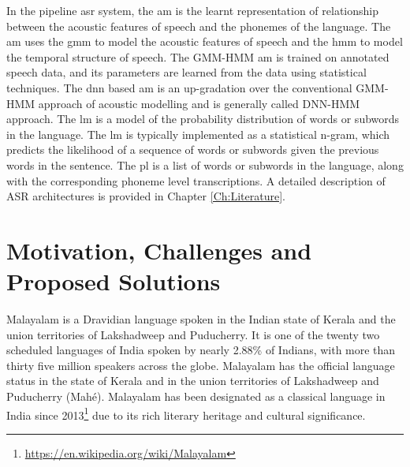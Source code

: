


In the pipeline \gls{asr} system, the \gls{am} is the learnt
representation of relationship between the acoustic features of speech and the
phonemes of the language. The \gls{am} uses the \gls{gmm} to model the acoustic
features of speech and the \gls{hmm} to model the temporal structure of speech.
The GMM-HMM \gls{am} is trained on annotated speech data, and its parameters
are learned from the data using statistical techniques. The \gls{dnn} based
\gls{am} is an up-gradation over the conventional GMM-HMM approach of acoustic
modelling and is generally called DNN-HMM approach. The \gls{lm} is a model of
the probability distribution of words or subwords in the language. The \gls{lm}
is typically implemented as a statistical n-gram, which predicts the likelihood
of a sequence of words or subwords given the previous words in the sentence.
The \gls{pl} is a list of words or subwords in the language, along with the
corresponding phoneme level transcriptions. A detailed description of ASR
architectures is provided in Chapter \ref{Ch:Literature}.

\section{Motivation, Challenges and Proposed Solutions}

Malayalam is a Dravidian language spoken in the Indian state of Kerala and the union territories of Lakshadweep and Puducherry. It is one of the twenty two scheduled languages of India spoken by nearly 2.88\% of Indians, with more than thirty five million speakers across the globe. Malayalam has the official language status in the state of Kerala and in the union
territories of Lakshadweep and Puducherry (Mahé). Malayalam has been designated as a classical language in India since
2013\footnote{\url{https://en.wikipedia.org/wiki/Malayalam}} due to its rich literary heritage and cultural significance. 

